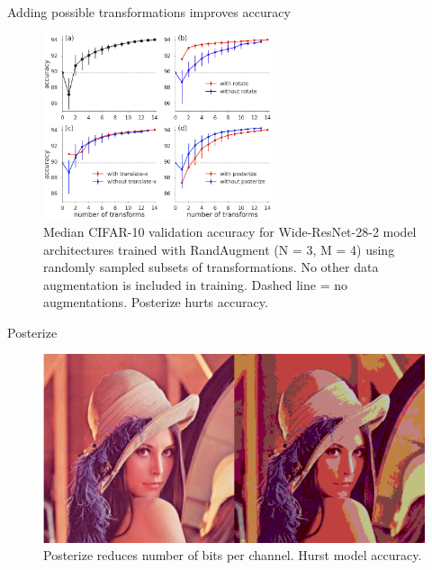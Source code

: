 \documentclass{beamer}
\begin{document}
\begin{frame}{Adding possible transformations improves accuracy}
\begin{figure}[h]
\includegraphics[width=0.6\textwidth]{img/N}
\caption{Median CIFAR-10 validation accuracy for Wide-ResNet-28-2 model architectures trained with RandAugment (N = 3, M = 4) using randomly sampled subsets of transformations. No other data augmentation is included in training. Dashed line = no augmentations. Posterize hurts accuracy.}
\end{figure}
\end{frame}
\begin{frame}{Posterize}
\begin{figure}[h]
\includegraphics[width=\textwidth]{img/posterize}
\caption{Posterize reduces number of bits per channel. Hurst model accuracy.}
\end{figure}
\end{frame}
\end{document}
